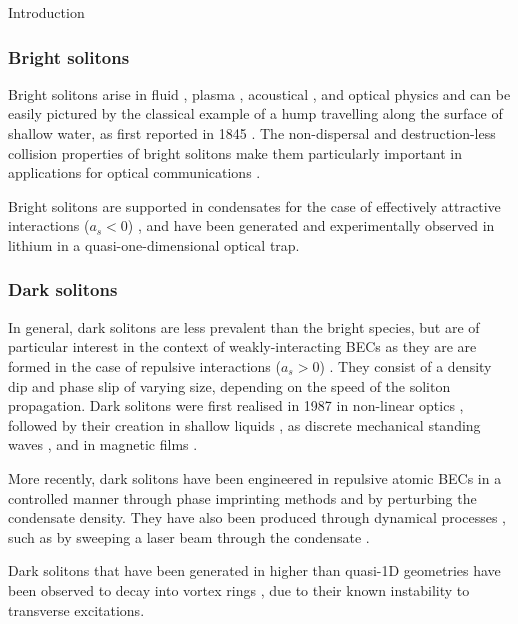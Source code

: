 \begin{chapter}{\label{cha:bose_gases}Introduction}
\subsubsection{Bright solitons}
Bright solitons arise in fluid \cite{Russell45}, plasma \cite{PhysRevLett.37.693,PhysRevLett.33.886}, acoustical \cite{naugolnykh1998nonlinear}, and optical physics \cite{agrawal2001nonlinear} and can be easily pictured by the classical example of a hump travelling along the surface of shallow water, as first reported in 1845 \cite{Russell45}. The non-dispersal and destruction-less collision properties of bright solitons make them particularly important in applications for optical communications \cite{hasegawa1995solitons}.

Bright solitons are supported in condensates for the case of effectively attractive interactions ($a_s < 0$) \cite{PhysRevA.62.063611}, and have been generated and experimentally observed in lithium \cite{Strecker02} in a quasi-one-dimensional optical trap.

\subsubsection{Dark solitons}
In general, dark solitons are less prevalent than the bright species, but are of particular interest in the context of weakly-interacting BECs as they are are formed in the case of repulsive interactions ($a_s > 0$) \cite{PhysRevA.62.063610}. They consist of a density dip and phase slip \cite{dodd1982solitons} of varying size, depending on the speed of the soliton propagation. Dark solitons were first realised in 1987 in non-linear optics \cite{Emplit87}, followed by their creation in shallow liquids \cite{PhysRevLett.64.1518}, as discrete mechanical standing waves \cite{PhysRevLett.68.1730}, and in magnetic films \cite{PhysRevLett.70.1707}.

More recently, dark solitons have been engineered in repulsive atomic BECs in a controlled manner through phase imprinting methods \cite{Denschlag97,Burger99,PhysRevLett.86.2926,PhysRevLett.101.120406} and by perturbing the condensate density. They have also been produced through dynamical processes \cite{Weller08,PhysRevLett.99.160405}, such as by sweeping a laser beam through the condensate \cite{PhysRevLett.99.160405}. 

Dark solitons that have been generated in higher than quasi-1D geometries have been observed to decay into vortex rings \cite{PhysRevLett.86.2926,Dutton27072001,Shomroni09}, due to their known instability to transverse excitations.



\end{chapter}
